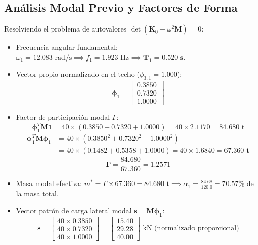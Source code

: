 \documentclass[11pt,letterpaper]{article}
\begin{document}
\subsection{Análisis Modal Previo y Factores de Forma}

Resolviendo el problema de autovalores $\det(\mathbf{K}_0 - \omega^2 \mathbf{M}) = 0$:
\begin{itemize}
    \item Frecuencia angular fundamental: $\omega_1 = 12.083\text{ rad/s} \implies f_1 = 1.923\text{ Hz} \implies \mathbf{T_1 = 0.520\text{ s}}$.
    \item Vector propio normalizado en el techo ($\phi_{3,1} = 1.000$):
    \begin{equation}
        \bm{\phi}_1 = \begin{bmatrix} 0.3850 \\ 0.7320 \\ 1.0000 \end{bmatrix}
    \end{equation}
    \item Factor de participación modal $\Gamma$:
    \begin{equation}
        \bm{\phi}_1^T \mathbf{M} \mathbf{1} = 40 \times (0.3850 + 0.7320 + 1.0000) = 40 \times 2.1170 = 84.680\text{ t}
    \end{equation}
    \begin{align}
        \bm{\phi}_1^T \mathbf{M} \bm{\phi}_1 &= 40 \times (0.3850^2 + 0.7320^2 + 1.0000^2) \nonumber\\
        &= 40 \times (0.1482 + 0.5358 + 1.0000) = 40 \times 1.6840 = \mathbf{67.360\text{ t}}
    \end{align}
    \begin{equation}
        \mathbf{\Gamma = \frac{84.680}{67.360} = 1.2571}
    \end{equation}
    \item Masa modal efectiva: $m^* = \Gamma \times 67.360 = 84.680\text{ t} \implies \alpha_1 = \frac{84.68}{120.0} = \mathbf{70.57\%}$ de la masa total.
    \item Vector patrón de carga lateral modal $\mathbf{s} = \mathbf{M} \bm{\phi}_1$:
    \begin{equation}
        \mathbf{s} = \begin{bmatrix} 40 \times 0.3850 \\ 40 \times 0.7320 \\ 40 \times 1.0000 \end{bmatrix} = \begin{bmatrix} 15.40 \\ 29.28 \\ 40.00 \end{bmatrix} \text{ kN (normalizado proporcional)}

\end{equation}
\end{itemize}
\end{document}
